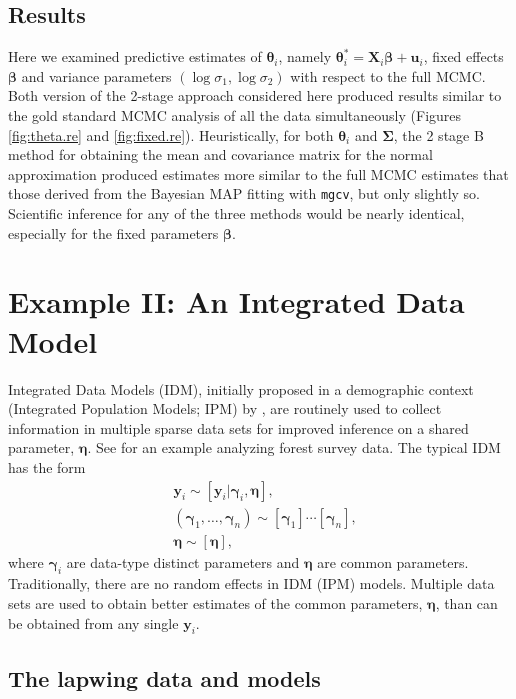 \documentclass[12pt]{article}
\newcommand{\by}{\mathbf{y}}
\newcommand{\bt}{\boldsymbol{\theta}}
\newcommand{\bb}{\boldsymbol{\beta}}
\newcommand{\bn}{\boldsymbol{\eta}}
\newcommand{\bg}{\boldsymbol{\gamma}}
\newcommand{\bSig}{\boldsymbol{\Sigma}}
\newcommand{\bX}{\mathbf{X}}
\newcommand{\bu}{\mathbf{u}}
\begin{document}
\subsection{Results}
Here we examined predictive estimates of $\bt_i$, namely $\bt_i^* = \bX_i\bb + \hat{\bu}_i$, fixed effects $\bb$ and variance parameters $(\log\sigma_1, \log\sigma_2)$ with respect to the full MCMC. Both version of the 2-stage approach considered here produced results similar to the gold standard MCMC analysis of all the data simultaneously (Figures \ref{fig:theta.re} and \ref{fig:fixed.re}). Heuristically, for both $\bt_i$ and $\bSig$, the 2 stage B method for obtaining the mean and covariance matrix for the normal approximation produced estimates more similar to the full MCMC estimates that those derived from the Bayesian MAP fitting with {\tt mgcv}, but only slightly so. Scientific inference for any of the three methods would be nearly identical, especially for the fixed parameters $\bb$. 





\section{Example II: An Integrated Data Model}

Integrated Data Models (IDM), initially proposed in a demographic context (Integrated Population Models; IPM) by \cite{besbeas2002integrating}, are routinely used to collect information in multiple sparse data sets for improved inference on a shared parameter, $\bn$. See \cite{Hanks:2011vn} for an example analyzing forest survey data. The typical IDM \citep{schaub2011integrated} has the form
\[
\begin{aligned}
&\by_i \sim [\by_i|\bg_i, \bn], \\
&(\bg_1,\dots,\bg_n) \sim [\bg_1]\cdots[\bg_n],\\
&\bn \sim [\bn],
\end{aligned}
\]
where $\bg_i$ are data-type distinct parameters and $\bn$ are common parameters. Traditionally, there are no random effects in IDM (IPM) models. Multiple data sets are used to obtain better estimates of the common parameters, $\bn$, than can be obtained from any single $\by_i$. 

\subsection{The lapwing data and models}
\end{document}

